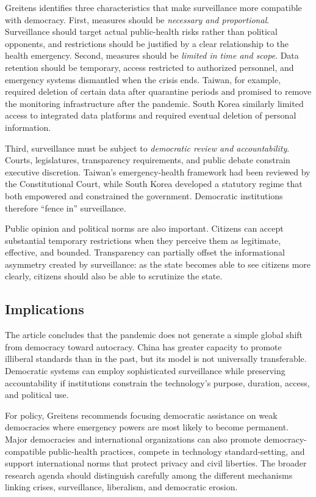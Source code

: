 Greitens identifies three characteristics that make surveillance more compatible with democracy. First, measures should be \textit{necessary and proportional}. Surveillance should target actual public-health risks rather than political opponents, and restrictions should be justified by a clear relationship to the health emergency. Second, measures should be \textit{limited in time and scope}. Data retention should be temporary, access restricted to authorized personnel, and emergency systems dismantled when the crisis ends. Taiwan, for example, required deletion of certain data after quarantine periods and promised to remove the monitoring infrastructure after the pandemic. South Korea similarly limited access to integrated data platforms and required eventual deletion of personal information.

Third, surveillance must be subject to \textit{democratic review and accountability}. Courts, legislatures, transparency requirements, and public debate constrain executive discretion. Taiwan's emergency-health framework had been reviewed by the Constitutional Court, while South Korea developed a statutory regime that both empowered and constrained the government. Democratic institutions therefore ``fence in'' surveillance.

Public opinion and political norms are also important. Citizens can accept substantial temporary restrictions when they perceive them as legitimate, effective, and bounded. Transparency can partially offset the informational asymmetry created by surveillance: as the state becomes able to see citizens more clearly, citizens should also be able to scrutinize the state.

\subsection{Implications}

The article concludes that the pandemic does not generate a simple global shift from democracy toward autocracy. China has greater capacity to promote illiberal standards than in the past, but its model is not universally transferable. Democratic systems can employ sophisticated surveillance while preserving accountability if institutions constrain the technology's purpose, duration, access, and political use.

For policy, Greitens recommends focusing democratic assistance on weak democracies where emergency powers are most likely to become permanent. Major democracies and international organizations can also promote democracy-compatible public-health practices, compete in technology standard-setting, and support international norms that protect privacy and civil liberties. The broader research agenda should distinguish carefully among the different mechanisms linking crises, surveillance, liberalism, and democratic erosion.


